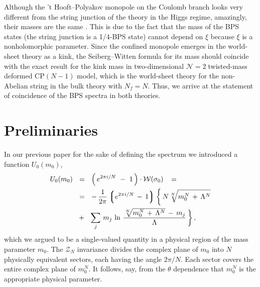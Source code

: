 \documentclass[epsfig,12pt]{article}
\newcommand{\ntwo}{${\mathcal N}=2\;$}
\newcommand{\mc}[1]{\mathcal{#1}}
\newcommand{\lgr}{\left\lgroup}
\newcommand{\rgr}{\right\rgroup}
\begin{document}
Although the 't Hooft--Polyakov monopole on the Coulomb branch
looks very different from the string junction of the theory in the Higgs regime,
amazingly, their masses are the same 
\cite{Shifman:2004dr,4}. This is due to the fact that
the mass of the BPS states (the string junction is a 1/4-BPS state) cannot depend on
$\xi$ because $\xi$ is a nonholomorphic parameter. Since the confined monopole
emerges in the world-sheet theory as a kink, the Seiberg--Witten
formula for its mass should coincide with the exact result for the kink
mass in two-dimensional \ntwo twisted-mass deformed  CP$(N-1)$ model, which is 
the world-sheet theory for the non-Abelian string in the bulk theory with $N_f=N$. 
 Thus, we arrive at
the statement of coincidence of the BPS spectra in both theories.







\section{Preliminaries}
\setcounter{equation}{0}
\label{prer}

	In our previous paper \cite{Bolokhov:2011mp} for the sake of defining the spectrum we introduced a function $ U_0(m_0) $,
\begin{align}
%
	U_0 (m_0) & ~~=~~ \left(\, e^{2 \pi i / N} ~-~ 1 \,\right) \cdot \mc{W}(\sigma_0)\,
	~~=~~
\nonumber
	\\
%
	&
	~~=~~ -\, \frac{1}{2\pi} \lgr e^{2\pi i / N} \,-\, 1 \rgr \biggl\{\, N \sqrt[N] { m_0^N \,+\, \Lambda^N }  
%
	\\
	&
	~~+~~  \sum_j\, m_j\, \ln \, \frac{ \sqrt[N] { m_0^N \,+\, \Lambda^N } \,-\, m_j } { \Lambda} \,\biggr\}\,,
\end{align}
	which we argued to be a single-valued quantity in a physical region of the mass parameter $ m_0 $.
	The $\mc{Z}_N$ invariance divides the complex plane of $ m_0 $ into $ N $ physically equivalent  sectors,
	each having the angle $2\pi/N$. Each sector covers the entire complex plane of
	$m_0^N$. 
	It follows, say, from the $\theta$ dependence that $m_0^N$ is the appropriate physical parameter.
	
\end{document}
